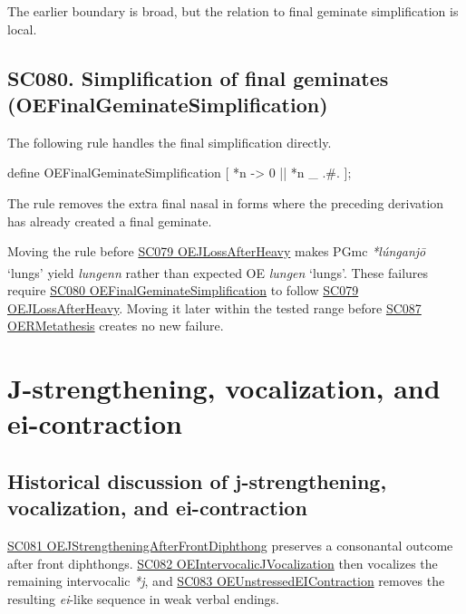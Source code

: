 \documentclass[
  british,
  a4paper,
  openany]{book}
\providecommand{\Pred}[1]{\textsuperscript{\dag}\emph{#1}}
\providecommand{\Recon}[1]{\emph{*#1}}
{\catcode`→=\active \global\def→{\ensuremath{\rightarrow}}}
\providecommand{\texorpdfstring}[2]{#1}
\DeclareRobustCommand{\CAPRRuleHeading}[2]{%
  #1\texorpdfstring{\\(#2)}{ (#2)}%
}
\providecommand{\Pred}[1]{\textsuperscript{\dag}\emph{#1}}
\providecommand{\Recon}[1]{\emph{*#1}}
{\catcode`→=\active \global\def→{\ensuremath{\rightarrow}}}
\begin{document}
The earlier boundary is broad, but the relation to final geminate
simplification is local.

\subsection{\texorpdfstring{\CAPRRuleHeading{SC080. Simplification of final geminates}{OEFinalGeminateSimplification}}{}}\label{rule-OEFinalGeminateSimplification}

The following rule handles the final simplification directly.

\begin{ReaderFacingFoma}
define OEFinalGeminateSimplification [
    {*n} -> 0 || {*n} _ .#.
];
\end{ReaderFacingFoma}

The rule removes the extra final nasal in forms where the preceding
derivation has already created a final geminate.

Moving the rule before \hyperref[rule-OEJLossAfterHeavy]{SC079
OEJLossAfterHeavy} makes PGmc \Recon{lúnganjō} `lungs' yield
\Pred{lungenn} rather than expected OE \emph{lungen} `lungs'. These
failures require \hyperref[rule-OEFinalGeminateSimplification]{SC080
OEFinalGeminateSimplification} to follow
\hyperref[rule-OEJLossAfterHeavy]{SC079 OEJLossAfterHeavy}. Moving it
later within the tested range before \hyperref[rule-OERMetathesis]{SC087
OERMetathesis} creates no new failure.

\newpage

\section{J-strengthening, vocalization, and
ei-contraction}\label{j-strengthening-vocalization-and-ei-contraction}

\subsection{Historical discussion of j-strengthening, vocalization, and
ei-contraction}\label{historical-discussion-of-j-strengthening-vocalization-and-ei-contraction}

\hyperref[rule-OEJStrengtheningAfterFrontDiphthong]{SC081
OEJStrengtheningAfterFrontDiphthong} preserves a consonantal outcome
after front diphthongs.
\hyperref[rule-OEIntervocalicJVocalization]{SC082
OEIntervocalicJVocalization} then vocalizes the remaining intervocalic
\emph{*j}, and \hyperref[rule-OEUnstressedEIContraction]{SC083
OEUnstressedEIContraction} removes the resulting \emph{ei}-like sequence
in weak verbal endings.
\end{document}
